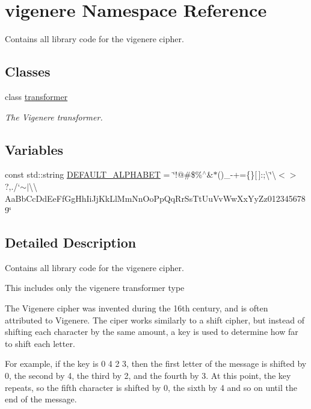 \hypertarget{namespacevigenere}{}\section{vigenere Namespace Reference}
\label{namespacevigenere}


Contains all library code for the vigenere cipher.  


\subsection*{Classes}
\begin{DoxyCompactItemize}
\item 
class \hyperlink{classvigenere_1_1transformer}{transformer}
\begin{DoxyCompactList}\small\item\em The Vigenere transformer. \end{DoxyCompactList}\end{DoxyCompactItemize}
\subsection*{Variables}
\begin{DoxyCompactItemize}
\item 
const std\+::string \hyperlink{namespacevigenere_a7bb30f050b9b52887eb2463b36c4e7b6}{D\+E\+F\+A\+U\+L\+T\+\_\+\+A\+L\+P\+H\+A\+B\+ET} = \char`\"{}!@\#\$\%$^\wedge$\&$\ast$()\+\_\+-\/+=\{\}\mbox{[}$\,$\mbox{]}\+:;\textbackslash{}\char`\"{}\textbackslash{}\textquotesingle{}$<$$>$?,./`$\sim$$\vert$\textbackslash{}\textbackslash{} Aa\+Bb\+Cc\+Dd\+Ee\+Ff\+Gg\+Hh\+Ii\+Jj\+Kk\+Ll\+Mm\+Nn\+Oo\+Pp\+Qq\+Rr\+Ss\+Tt\+Uu\+Vv\+Ww\+Xx\+Yy\+Zz0123456789\char`\"{}
\end{DoxyCompactItemize}


\subsection{Detailed Description}
Contains all library code for the vigenere cipher. 

This includes only the vigenere transformer type

The Vigenere cipher was invented during the 16th century, and is often attributed to Vigenere. The ciper works similarly to a shift cipher, but instead of shifting each character by the same amount, a key is used to determine how far to shift each letter.

For example, if the key is \textquotesingle{}0 4 2 3\textquotesingle{}, then the first letter of the message is shifted by 0, the second by 4, the third by 2, and the fourth by 3. At this point, the key repeats, so the fifth character is shifted by 0, the sixth by 4 and so on until the end of the message.


